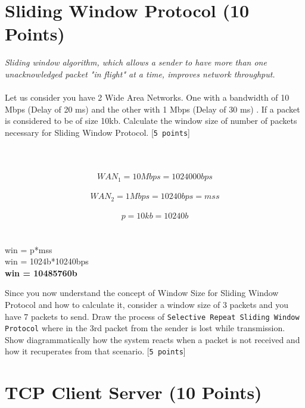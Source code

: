 \documentclass{WeSTassignment}
\begin{document}
\section{Sliding Window Protocol (10 Points)}
\emph{Sliding window algorithm, which allows a sender to have more than one unacknowledged packet "in flight" at a time, improves network throughput. }\\ \\
Let us consider you have 2 Wide Area Networks. One with a bandwidth of 10 Mbps (Delay of 20 ms) and the other with 1 Mbps (Delay of 30 ms) . If a packet is considered to be of size 10kb. Calculate the window size of number of packets necessary for Sliding Window Protocol. [\texttt{5 points}]\\ \\
\\ \\
\[WAN_1 = 10Mbps = 1024000bps\]\\
\[WAN_2 = 1Mbps  = 10240bps = mss \]\\
\[p     = 10kb   = 10240b \]
\\ \\
win = p*mss \\
win = 1024b*10240bps \\
\textbf{win = 10485760b}

Since you now understand the concept of Window Size for Sliding Window Protocol and how to calculate it, consider a window size of 3 packets and you have 7 packets to send. Draw the process of \texttt{Selective Repeat Sliding Window Protocol} where in the 3rd packet from the sender is lost while transmission. Show diagrammatically how the system reacts when a packet is not received and how it recuperates from that scenario. [\texttt{5 points}] \\





\section{TCP Client Server (10 Points)}
\end{document}
